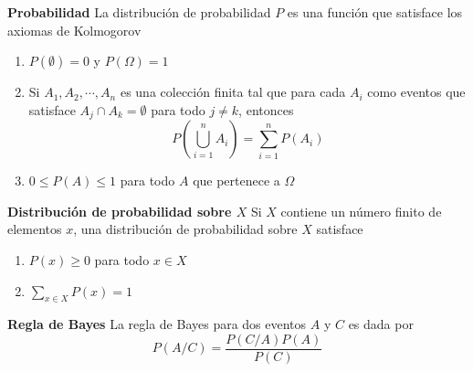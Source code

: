 \begin{definition}
    \textbf{Probabilidad} \citep{koski2011bayesian}
    La distribución de probabilidad $P$ es una función que satisface los axiomas de Kolmogorov
    \begin{enumerate}
        \item $P(\emptyset) = 0$ y $P(\Omega) = 1$
        \item Si ${A}_{1},{A}_{2},\cdots,{A}_{n}$ es una colección finita tal que para cada $A_i$ como eventos que satisface ${A}_{j} \cap {A}_{k} = \emptyset$ para todo $j \neq k$, entonces
        $$P(\bigcup_{i=1}^{n} {A}_{i})=\sum\limits_{i = 1}^{n}P(A_i)$$ 
        \item $0 \leq P(A) \leq 1$ para todo $A$ que pertenece a $\Omega$
    \end{enumerate}
\end{definition}

\begin{definition}
    \textbf{Distribución de probabilidad sobre $X$} \citep{koski2011bayesian}
    Si $X$ contiene un número finito de elementos $x$, una distribución de probabilidad sobre $X$ satisface
    \begin{enumerate}
        \item $P(x) \geq 0$ para todo $x \in X$
        \item $\sum\limits_{x \in X}^{}P(x) = 1$
    \end{enumerate}
\end{definition}

\begin{definition}
    \textbf{Regla de Bayes} \citep{koski2011bayesian}
    La regla de Bayes para dos eventos $A$ y $C$ es dada por
    $$P(A/C) = \frac{P(C/A)P(A)}{P(C)}$$
\end{definition}

